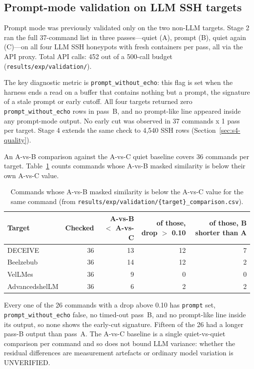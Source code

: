 \documentclass[a4paper,11pt]{article}
\begin{document}
\subsection{Prompt-mode validation on LLM SSH targets}
\label{sec:prompt-val}

Prompt mode was previously validated only on the two non-LLM targets. Stage 2
ran the full 37-command list in three passes---quiet (A), prompt (B), quiet
again (C)---on all four LLM SSH honeypots with fresh containers per pass, all
via the API proxy. Total API calls: 452 out of a 500-call budget
(\texttt{results/exp/validation/}).

The key diagnostic metric is \texttt{prompt\_without\_echo}: this flag is set
when the harness ends a read on a buffer that contains nothing but a prompt,
the signature of a stale prompt or early cutoff. All four targets returned zero
\texttt{prompt\_without\_echo} rows in pass~B, and no prompt-like line appeared
inside any prompt-mode output. No early cut was observed in 37 commands x 1
pass per target. Stage 4 extends the same check to 4,540 SSH rows
(Section~\ref{sec:s4-quality}).

An A-vs-B comparison against the A-vs-C quiet baseline covers 36 commands per
target. Table~\ref{tab:abac} counts commands whose A-vs-B masked similarity is
below their own A-vs-C value.

\begin{table}[ht]
\centering
\caption{Commands whose A-vs-B masked similarity is below the A-vs-C value for
the same command (from
\texttt{results/exp/validation/\{target\}\_comparison.csv}).}
\label{tab:abac}
\scriptsize
\begin{tabular}{l r r r r}
\toprule
Target & Checked & A-vs-B $<$ A-vs-C & of those, drop $>$ 0.10 & of those, B shorter than A \\
\midrule
DECEIVE        & 36 & 13 & 12 & 7 \\
Beelzebub      & 36 & 14 & 12 & 2 \\
VelLMes        & 36 & 9  & 0  & 0 \\
AdvancedshelLM & 36 & 6  & 2  & 2 \\
\bottomrule
\end{tabular}
\end{table}

Every one of the 26 commands with a drop above 0.10 has \texttt{prompt} set,
\texttt{prompt\_without\_echo} false, no timed-out pass~B, and no prompt-like
line inside its output, so none shows the early-cut signature. Fifteen of the
26 had a longer pass-B output than pass~A. The A-vs-C baseline is a single
quiet-vs-quiet comparison per command and so does not bound LLM variance:
whether the residual differences are measurement artefacts or ordinary model
variation is UNVERIFIED.
\end{document}
